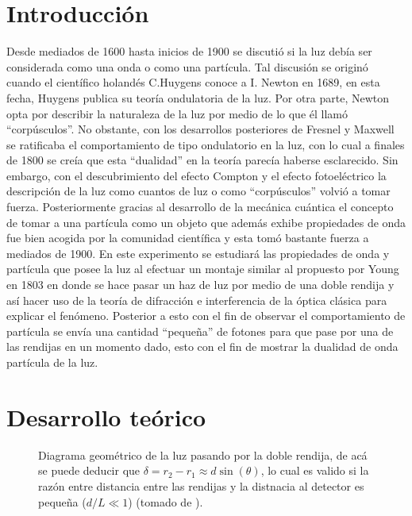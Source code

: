 \documentclass[%
 reprint,
 amsmath,amssymb,
 aps,
]{revtex4-1}
\begin{document}
\section{Introducción}
Desde mediados de 1600 hasta inicios de 1900 se discutió si la luz debía ser considerada como una onda o como una partícula. Tal discusión se originó cuando el científico holandés C.Huygens conoce a  I. Newton en 1689, en esta fecha, Huygens publica su  teoría ondulatoria de la luz. Por otra parte, Newton opta por describir la naturaleza de la luz por medio de lo que él llamó “corpúsculos”. No obstante, con los desarrollos posteriores de Fresnel y Maxwell se ratificaba el comportamiento de tipo ondulatorio en la luz, con lo cual a finales de 1800 se creía que esta “dualidad” en la teoría parecía haberse esclarecido. Sin embargo, con el descubrimiento del efecto Compton y el efecto fotoeléctrico la descripción de la luz como cuantos de luz o como “corpúsculos” volvió a tomar fuerza. Posteriormente gracias al desarrollo de la mecánica cuántica el concepto de tomar a una partícula como un objeto que además exhibe propiedades de onda fue bien acogida por la comunidad científica y esta tomó bastante fuerza a mediados de 1900. En este experimento se estudiará las propiedades de onda y partícula que posee la luz al efectuar un montaje similar al propuesto por Young en 1803 en donde se hace pasar un haz de luz por medio de una doble rendija y así hacer uso de la teoría de difracción e interferencia de la óptica clásica para explicar el fenómeno. Posterior a esto con el fin de observar el comportamiento de partícula se envía una cantidad “pequeña” de fotones para que pase por una de las rendijas en un momento dado, esto con el fin de mostrar la dualidad de onda partícula de la luz.
\section{Desarrollo teórico}
\begin{figure}[ht]
\caption{\label{doble rendija} Diagrama geométrico de la luz pasando por la doble rendija, de acá se puede deducir que $\delta=r_2-r_1\approx d\sin(\theta)$, lo cual es valido si la razón entre distancia entre las rendijas y la distnacia al detector es pequeña ($d/L\ll 1$)   (tomado de \cite{MIT}).}
\end{figure}
\end{document}
